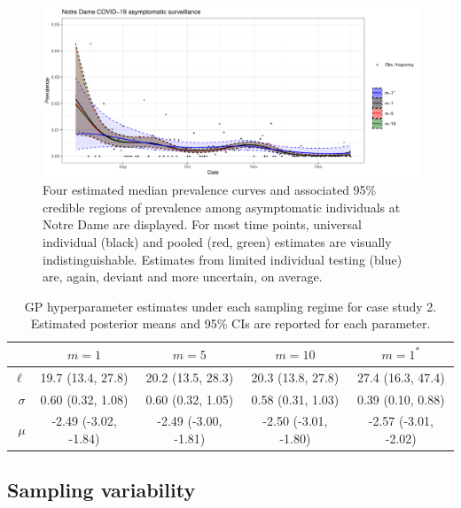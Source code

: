 \documentclass{article}
\begin{document}
\begin{figure}[h!]
\centerline{\includegraphics[width=.8\textwidth]{Figure3.pdf}}
\caption{Four estimated median prevalence curves and associated 95\% credible regions of prevalence among asymptomatic individuals at Notre Dame are displayed. For most time points, universal individual (black) and pooled (red, green) estimates are visually indistinguishable. Estimates from limited individual testing (blue) are, again, deviant and more uncertain, on average.\label{fig3}}
\end{figure}

\begin{table}[h]
\caption{GP hyperparameter estimates under each sampling regime for case study 2. Estimated posterior means and 95\% CIs are reported for each parameter.} \centering
\begin{tabular}{ r | c   c   c   c  } \toprule
        & $m=1$ & $m=5$ & $m=10$ &  $m=1^*$\\
\midrule
$\ell$ & 19.7 (13.4, 27.8) & 20.2 (13.5, 28.3)  & 20.3 (13.8, 27.8) & 27.4 (16.3, 47.4)   \\
$\sigma$ & 0.60 (0.32, 1.08) & 0.60 (0.32, 1.05) & 0.58 (0.31, 1.03)  & 0.39 (0.10, 0.88) \\
$\mu$ & -2.49 (-3.02, -1.84) &  -2.49 (-3.00, -1.81)  & -2.50 (-3.01, -1.80)  & -2.57 (-3.01, -2.02) \\
\bottomrule 
\end{tabular}
\label{t4}
\end{table}


\subsection{Sampling variability}
\end{document}
